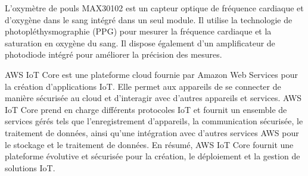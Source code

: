 \begin{flushleft}
	L'oxymètre de pouls MAX30102 est un capteur optique de fréquence cardiaque et d'oxygène dans le sang intégré dans un seul module. Il utilise la technologie de photopléthysmographie (PPG) pour mesurer la fréquence cardiaque et la saturation en oxygène du sang. Il dispose également d'un amplificateur de photodiode intégré pour améliorer la précision des mesures.\newline
	
	AWS IoT Core est une plateforme cloud fournie par Amazon Web Services pour la création d'applications IoT. Elle permet aux appareils de se connecter de manière sécurisée au cloud et d'interagir avec d'autres appareils et services. AWS IoT Core prend en charge différents protocoles IoT et fournit un ensemble de services gérés tels que l'enregistrement d'appareils, la communication sécurisée, le traitement de données, ainsi qu'une intégration avec d'autres services AWS pour le stockage et le traitement de données. En résumé, AWS IoT Core fournit une plateforme évolutive et sécurisée pour la création, le déploiement et la gestion de solutions IoT.\newline
	

	\newpage
\end{flushleft}